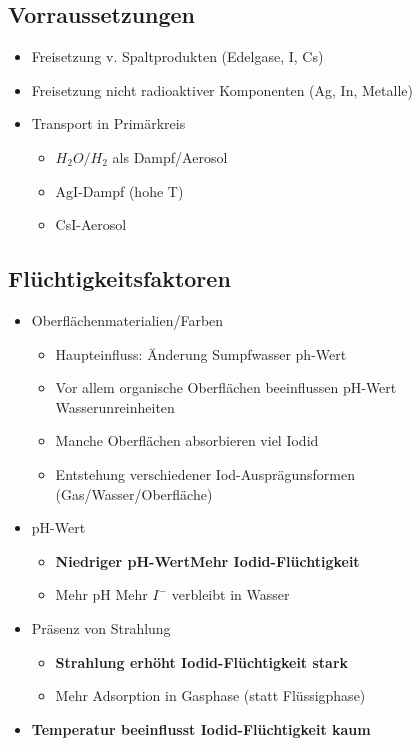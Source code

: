 \documentclass[12pt]{article}
\begin{document}
\subsection{Vorraussetzungen}
\begin{itemize}[noitemsep]
	\item Freisetzung v. Spaltprodukten (Edelgase, I, Cs)
	\item Freisetzung nicht radioaktiver Komponenten (Ag, In, Metalle)
	\item Transport in Primärkreis
		\begin{itemize}[noitemsep]
			\item \(H_2O/H_2\) als Dampf/Aerosol
			\item AgI-Dampf (hohe T)
			\item CsI-Aerosol
		\end{itemize}
\end{itemize}

\subsection{Flüchtigkeitsfaktoren}
\begin{itemize}[noitemsep]
	\item Oberflächenmaterialien/Farben
		\begin{itemize}[noitemsep]
			\item Haupteinfluss: Änderung Sumpfwasser ph-Wert
			\item Vor allem organische Oberflächen beeinflussen pH-Wert \textrightarrow Wasserunreinheiten
			\item Manche Oberflächen absorbieren viel Iodid
			\item Entstehung verschiedener Iod-Ausprägunsformen (Gas/Wasser/Oberfläche)
		\end{itemize}
	\item pH-Wert
		\begin{itemize}[noitemsep]
			\item \textbf{Niedriger pH-Wert\textrightarrow Mehr Iodid-Flüchtigkeit}
			\item Mehr pH \textrightarrow Mehr \(I^-\) verbleibt in Wasser
		\end{itemize}
	\item Präsenz von Strahlung
		\begin{itemize}[noitemsep]
			\item \textbf{Strahlung erhöht Iodid-Flüchtigkeit stark}
			\item Mehr Adsorption in Gasphase (statt Flüssigphase)
		\end{itemize}
	\item \textbf{Temperatur beeinflusst Iodid-Flüchtigkeit kaum}
\end{itemize}
\end{document}
